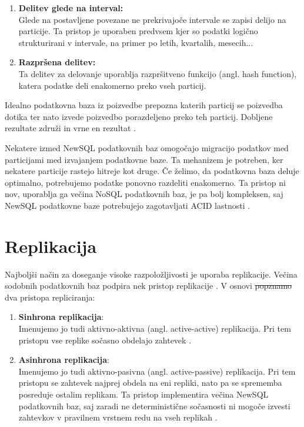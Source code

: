 \documentclass[a4paper, 12pt]{book}
\providecommand{\DIFaddtex}[1]{{\protect\color{blue}\uwave{#1}}} %
\providecommand{\DIFdeltex}[1]{{\protect\color{red}\sout{#1}}}                      %
\providecommand{\DIFaddbegin}{} %
\providecommand{\DIFaddend}{} %
\providecommand{\DIFdelbegin}{} %
\providecommand{\DIFdelend}{} %
\providecommand{\DIFadd}[1]{\texorpdfstring{\DIFaddtex{#1}}{#1}} %
\providecommand{\DIFdel}[1]{\texorpdfstring{\DIFdeltex{#1}}{}} %
\newcommand{\DIFscaledelfig}{0.5}
\newlength{\DIFdelgraphicswidth} %
\newlength{\DIFdelgraphicsheight} %
\newcommand{\DIFaddincludegraphics}[2][]{{\color{blue}\fbox{\DIFOincludegraphics[#1]{#2}}}} %
\newcommand{\DIFdelincludegraphics}[2][]{%
\sbox{\DIFdelgraphicsbox}{\DIFOincludegraphics[#1]{#2}}%
\settoboxwidth{\DIFdelgraphicswidth}{\DIFdelgraphicsbox} %
\settoboxtotalheight{\DIFdelgraphicsheight}{\DIFdelgraphicsbox} %
\scalebox{\DIFscaledelfig}{%
\parbox[b]{\DIFdelgraphicswidth}{\usebox{\DIFdelgraphicsbox}\\[-\baselineskip] \rule{\DIFdelgraphicswidth}{0em}}\llap{\resizebox{\DIFdelgraphicswidth}{\DIFdelgraphicsheight}{%
\setlength{\unitlength}{\DIFdelgraphicswidth}%
\begin{picture}(1,1)%
\thicklines\linethickness{2pt} %
{\color[rgb]{1,0,0}\put(0,0){\framebox(1,1){}}}%
{\color[rgb]{1,0,0}\put(0,0){\line( 1,1){1}}}%
{\color[rgb]{1,0,0}\put(0,1){\line(1,-1){1}}}%
\end{picture}%
}\hspace*{3pt}}} %
} %
\DeclareRobustCommand{\DIFaddbegin}{\DIFOaddbegin \let\includegraphics\DIFaddincludegraphics} %
\DeclareRobustCommand{\DIFaddend}{\DIFOaddend \let\includegraphics\DIFOincludegraphics} %
\DeclareRobustCommand{\DIFdelbegin}{\DIFOdelbegin \let\includegraphics\DIFdelincludegraphics} %
\DeclareRobustCommand{\DIFdelend}{\DIFOaddend \let\includegraphics\DIFOincludegraphics} %
\begin{document}
\begin{enumerate}
    \item \textbf{Delitev glede na interval:}\\Glede na postavljene povezane ne prekrivajoče intervale se zapisi delijo na particije. Ta pristop je uporaben predvsem kjer so podatki logično strukturirani v intervale, na primer po letih, kvartalih, mesecih...
    \item \textbf{Razpršena delitev:}\\Ta delitev za delovanje uporablja razpršitveno funkcijo (angl. hash function), katera podatke deli enakomerno preko vseh particij.
\end{enumerate}

Idealno podatkovna baza iz poizvedbe prepozna katerih particij se poizvedba dotika ter nato izvede poizvedbo porazdeljeno preko teh particij. Dobljene rezultate združi in vrne en rezultat \cite{Pavlo2016Sep}.

Nekatere izmed NewSQL podatkovnih baz omogočajo migracijo podatkov med particijami med izvajanjem podatkovne baze. Ta mehanizem je potreben, ker nekatere particije rastejo hitreje kot druge. Če želimo, da podatkovna baza deluje optimalno, potrebujemo podatke ponovno razdeliti enakomerno. Ta pristop ni nov, uporablja ga večina NoSQL podatkovnih baz, je pa bolj kompleksen, saj NewSQL podatkovne baze 
potrebujejo zagotavljati ACID lastnosti \cite{Pavlo2016Sep}.

\section{Replikacija}

Najboljši način za doseganje visoke razpoložljivosti je uporaba replikacije. Večina sodobnih podatkovnih baz podpira nek pristop replikacije \cite{Pavlo2016Sep}. V osnovi \DIFdelbegin \DIFdel{popznamo }\DIFdelend \DIFaddbegin \DIFadd{poznamo }\DIFaddend dva pristopa repliciranja:
\begin{enumerate}
    \item \textbf{Sinhrona replikacija}:\\Imenujemo jo tudi aktivno-aktivna (angl. active-active) replikacija. Pri tem pristopu vse replike sočasno obdelajo zahtevek \cite{Pavlo2016Sep}.

    \item \textbf{Asinhrona replikacija}:\\Imenujemo jo tudi aktivno-pasivna (angl. active-passive) replikacija. Pri tem pristopu se zahtevek najprej obdela na eni repliki, nato pa se sprememba posreduje ostalim replikam. Ta pristop implementira večina NewSQL podatkovnih baz, saj zaradi ne deterministične sočas\-nosti ni mogoče izvesti zahtevkov v pravilnem vrstnem redu na vseh replikah \cite{Pavlo2016Sep, harding2017evaluation}.
\end{enumerate}
\end{document}
